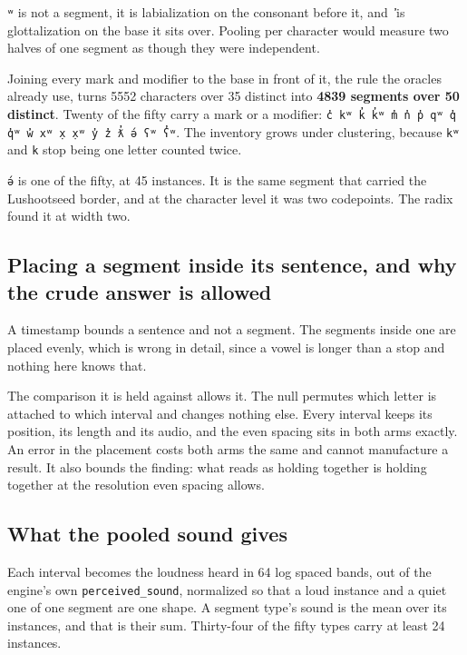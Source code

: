 \texttt{ʷ} is not a segment, it is labialization on the consonant before it, and \texttt{̓} is
glottalization on the base it sits over. Pooling per character would measure two halves of one
segment as though they were independent.

Joining every mark and modifier to the base in front of it, the rule the oracles already
use, turns 5552 characters over 35 distinct into \textbf{4839 segments over 50 distinct}. Twenty of
the fifty carry a mark or a modifier: \texttt{c̓ kʷ k̓ k̓ʷ m̓ n̓ p̓ qʷ q̓ q̓ʷ w̓ xʷ x̣ x̣ʷ y̓ z̓ ƛ̓ ə́ ʕʷ ʕ̓ʷ}.
The inventory grows under clustering, because \texttt{kʷ} and \texttt{k} stop
being one letter counted twice.

\texttt{ə́} is one of the fifty, at 45 instances. It is the same segment that carried the Lushootseed
border, and at the character level it was two codepoints. The radix found it at width
two.

\subsection{Placing a segment inside its sentence, and why the crude answer is allowed}

A timestamp bounds a sentence and not a segment. The segments inside one are placed evenly, which is
wrong in detail, since a vowel is longer than a stop and nothing here knows that.

The comparison it is held against allows it. The null permutes which letter is attached to
which interval and changes nothing else. Every interval keeps its position, its length and its
audio, and the even spacing sits in both arms exactly. An error in the placement costs both arms the
same and cannot manufacture a result. It also bounds the finding: what reads as holding together is
holding together at the resolution even spacing allows.

\subsection{What the pooled sound gives}

Each interval becomes the loudness heard in 64 log spaced bands, out of the engine's own
\texttt{perceived\_\allowbreak{}sound}, normalized so that a loud instance and a quiet one of one segment
are one shape. A segment type's sound is the mean over its instances, and that is their sum. Thirty-four
of the fifty types carry at least 24 instances.

